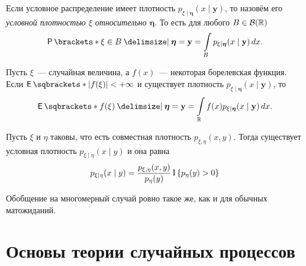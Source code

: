 \begin{definition}
	Если условное распределение имеет плотность \(p_{\xi \mid \bm{\eta}}(x \mid 
	\mathbf{y})\), то назовём его \emph{условной плотностью \(\xi\) 
	относительно \(\bm{\eta}\)}. То есть для любого \(B \in \mathcal{B}(\mathbb{R})\)
	\[
	\Pr{\xi \in B \given \bm{\eta} = \mathbf{y}} = \int\limits_{B} p_{\xi \mid 
	\bm{\eta}}(x \mid \mathbf{y})\diff x.
	\]
\end{definition}
\begin{theorem}
	Пусть \(\xi\)~--- случайная величина, а \(f(x)\)~--- некоторая борелевская 
	функция. Если \(\E{|f(\xi)|} < +\infty\) и существует плотность \(p_{\xi 
	\mid \bm{\eta}}(x \mid \mathbf{y})\), то
	\[
	\E{f(\xi) \given \bm{\eta} = \mathbf{y}} = \int\limits_{\R} f(x)p_{\xi \mid 
	\bm{\eta}}(x \mid \mathbf{y})\diff x.
	\]
\end{theorem}
\begin{theorem}
	Пусть \(\xi\) и \(\eta\) таковы, что есть совместная плотность \(p_{\xi, 
	\eta}(x, y)\). Тогда существует условная плотность \(p_{\xi \mid \eta}(x 
	\mid y)\) и она равна
	\[
	p_{\xi \mid \eta}(x \mid y) = \dfrac{p_{\xi, \eta}(x, 
	y)}{p_{\eta}(y)}\operatorname{\mathrm{I}}\left\{p_{\eta}(y) > 0\right\}
	\]
\end{theorem}

Обобщение на многомерный случай ровно такое же, как и для обычных матожиданий.

\section{Основы теории случайных процессов}

